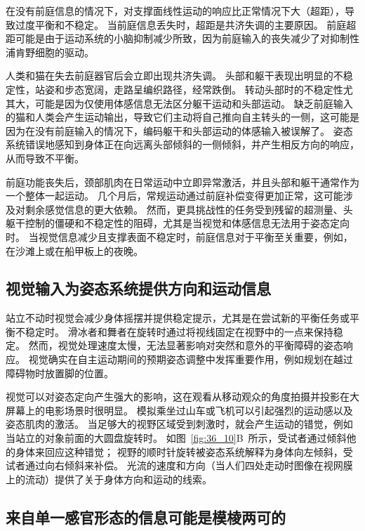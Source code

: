 在没有前庭信息的情况下，对支撑面线性运动的响应比正常情况下大（超距），导致过度平衡和不稳定。
当前庭信息丢失时，超距是共济失调的主要原因。
前庭超距可能是由于运动系统的小脑抑制减少所致，因为前庭输入的丧失减少了对抑制性浦肯野细胞的驱动。


人类和猫在失去前庭器官后会立即出现共济失调。
头部和躯干表现出明显的不稳定性，站姿和步态宽阔，走路呈编织路径，经常跌倒。
转动头部时的不稳定性尤其大，可能是因为仅使用体感信息无法区分躯干运动和头部运动。
缺乏前庭输入的猫和人类会产生运动输出，导致它们主动将自己推向自主转头的一侧，这可能是因为在没有前庭输入的情况下，编码躯干和头部运动的体感输入被误解了。
姿态系统错误地感知到身体正在向远离头部倾斜的一侧倾斜，并产生相反方向的响应，从而导致不平衡。


前庭功能丧失后，颈部肌肉在日常运动中立即异常激活，并且头部和躯干通常作为一个整体一起运动。
几个月后，常规运动通过前庭补偿变得更加正常，这可能涉及对剩余感觉信息的更大依赖。
然而，更具挑战性的任务受到残留的超测量、头躯干控制的僵硬和不稳定性的阻碍，尤其是当视觉和体感信息无法用于姿态定向时。
当视觉信息减少且支撑表面不稳定时，前庭信息对于平衡至关重要，例如，在沙滩上或在船甲板上的夜晚。



\subsection{视觉输入为姿态系统提供方向和运动信息}

站立不动时视觉会减少身体摇摆并提供稳定提示，尤其是在尝试新的平衡任务或平衡不稳定时。
滑冰者和舞者在旋转时通过将视线固定在视野中的一点来保持稳定。
然而，视觉处理速度太慢，无法显著影响对突然和意外的平衡障碍的姿态响应。
视觉确实在自主运动期间的预期姿态调整中发挥重要作用，例如规划在越过障碍物时放置脚的位置。


视觉可以对姿态定向产生强大的影响，这在观看从移动观众的角度拍摄并投影在大屏幕上的电影场景时很明显。
模拟乘坐过山车或飞机可以引起强烈的运动感以及姿态肌肉的激活。
当足够大的视野区域受到刺激时，就会产生运动的错觉，例如当站立的对象前面的大圆盘旋转时。
如图~\ref{fig:36_10}B~所示，受试者通过倾斜他的身体来回应这种错觉；
视野的顺时针旋转被姿态系统解释为身体向左倾斜，受试者通过向右倾斜来补偿。
光流的速度和方向（当人们四处走动时图像在视网膜上的流动）提供了关于身体方向和运动的线索。



\subsection{来自单一感官形态的信息可能是模棱两可的}

